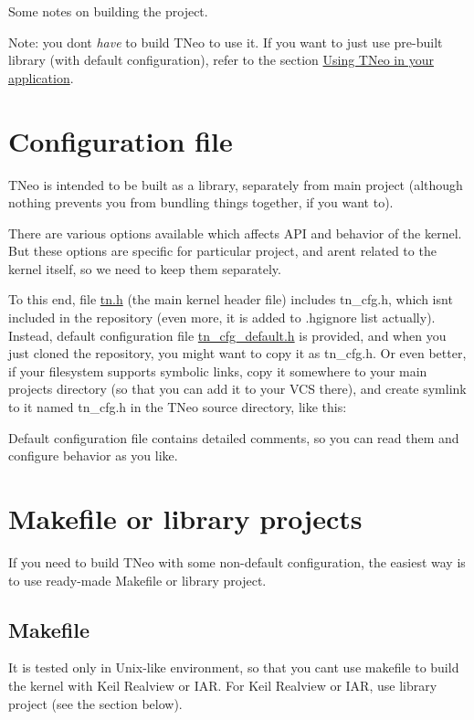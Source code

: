 Some notes on building the project.

Note\+: you don\textquotesingle{}t {\itshape have} to build T\+Neo to use it. If you want to just use pre-\/built library (with default configuration), refer to the section \hyperlink{quick_guide_usage_generic}{Using T\+Neo in your application}.\hypertarget{building_configuration_file}{}\section{Configuration file}\label{building_configuration_file}
T\+Neo is intended to be built as a library, separately from main project (although nothing prevents you from bundling things together, if you want to).

There are various options available which affects A\+PI and behavior of the kernel. But these options are specific for particular project, and aren\textquotesingle{}t related to the kernel itself, so we need to keep them separately.

To this end, file {\ttfamily \hyperlink{tn_8h}{tn.\+h}} (the main kernel header file) includes {\ttfamily tn\+\_\+cfg.\+h}, which isn\textquotesingle{}t included in the repository (even more, it is added to {\ttfamily .hgignore} list actually). Instead, default configuration file {\ttfamily \hyperlink{tn__cfg__default_8h}{tn\+\_\+cfg\+\_\+default.\+h}} is provided, and when you just cloned the repository, you might want to copy it as {\ttfamily tn\+\_\+cfg.\+h}. Or even better, if your filesystem supports symbolic links, copy it somewhere to your main project\textquotesingle{}s directory (so that you can add it to your V\+CS there), and create symlink to it named {\ttfamily tn\+\_\+cfg.\+h} in the T\+Neo source directory, like this\+: 


Default configuration file contains detailed comments, so you can read them and configure behavior as you like.\hypertarget{building_building_generic__makefile_lib_project}{}\section{Makefile or library projects}\label{building_building_generic__makefile_lib_project}
If you need to build T\+Neo with some non-\/default configuration, the easiest way is to use ready-\/made Makefile or library project.\hypertarget{building_building_generic__makefile}{}\subsection{Makefile}\label{building_building_generic__makefile}
It is tested only in Unix-\/like environment, so that you can\textquotesingle{}t use makefile to build the kernel with Keil Realview or I\+AR. For Keil Realview or I\+AR, use library project (see the section below).

